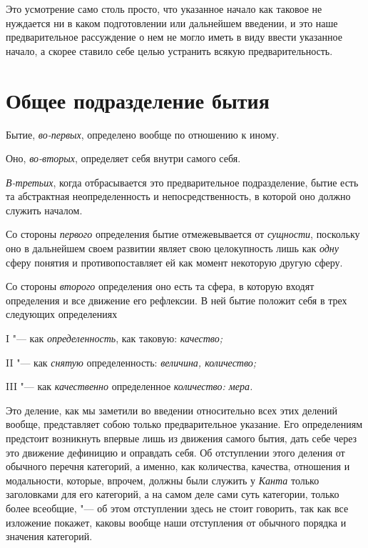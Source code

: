 Это усмотрение само столь просто, что указанное начало как таковое не
нуждается ни в каком подготовлении или дальнейшем введении, и это наше
предварительное рассуждение о нем не могло иметь в виду ввести указанное
начало, а скорее ставило себе целью устранить всякую предварительность.

\section[Общее подразделение бытия]{Общее подразделение бытия}
Бытие, {\em во-первых}, определено вообще по отношению к иному.

Оно, {\em во-вторых}, определяет себя внутри самого себя.

{\em В-третьих}, когда отбрасывается это предварительное
подразделение, бытие есть та абстрактная неопределенность и
непосредственность, в которой оно должно служить началом.

Со стороны {\em первого} определения бытие
отмежевывается от {\em сущности}, поскольку оно в
дальнейшем своем развитии являет свою целокупность лишь как
{\em одну} сферу понятия и противопоставляет ей как
момент некоторую другую сферу.

Со стороны {\em второго} определения оно есть та сфера,
в которую входят определения и все движение его рефлексии. В ней бытие
положит себя в трех следующих определениях

I "--- как {\em определенность}, как таковую: {\em качество;}

II "--- как {\em снятую} определенность: {\em величина, количество;}

III "--- как {\em качественно} определенное {\em количество: мера.}

Это деление, как мы заметили во введении относительно всех этих делений
вообще, представляет собою только предварительное указание. Его
определениям предстоит возникнуть впервые лишь из движения самого бытия,
дать себе через это движение дефиницию и оправдать себя. Об отступлении
этого деления от обычного перечня категорий, а именно, как количества,
качества, отношения и модальности, которые, впрочем, должны были служить у
{\em Канта} только заголовками для его категорий, а на
самом деле сами суть категории, только более всеобщие, "--- об этом
отступлении здесь не стоит говорить, так как все изложение покажет, каковы
вообще наши отступления от обычного порядка и значения категорий.

